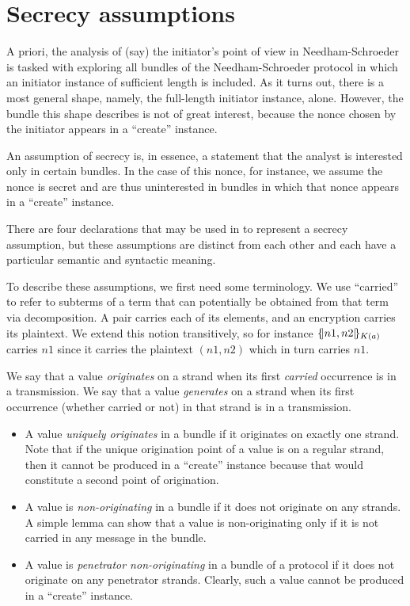 \section{Secrecy assumptions}
\label{sec:secrecy_assumptions}
A priori, the analysis of (say) the initiator's point of view in
Needham-Schroeder is tasked with exploring all bundles of the
Needham-Schroeder protocol in which an initiator instance of
sufficient length is included.  As it turns out, there is a most
general shape, namely, the full-length initiator instance, alone.
However, the bundle this shape describes is not of great interest,
because the nonce chosen by the initiator appears in a ``create''
instance.

An assumption of secrecy is, in essence, a statement that the analyst
is interested only in certain bundles.  In the case of this nonce, for
instance, we assume the nonce is secret and are thus uninterested in
bundles in which that nonce appears in a ``create'' instance.

There are four declarations that may be used in {\cpsa} to represent
a secrecy assumption, but these assumptions are distinct from each other
and each have a particular semantic and syntactic meaning.

To describe these assumptions, we first need some terminology.  We
use ``carried'' to refer to subterms of a term that can potentially be
obtained from that term via decomposition. A pair carries each of its
elements, and an encryption carries its plaintext.  We extend this
notion transitively, so for instance $\{\!|n1, n2|\!\}_{K(a)}$ carries $n1$
since it carries the plaintext $(n1, n2)$ which in turn carries $n1$.

 We say that a value \emph{originates} on a strand
when its first \emph{carried} occurrence is in a transmission.
 We say that a value \emph{generates} on a strand
when its first occurrence (whether carried or not) in that strand is
in a transmission.

\begin{itemize}
\item A value \emph{uniquely originates} in a bundle if it originates
  on exactly one strand.  Note that if the unique origination point of
  a value is on a regular strand, then it cannot be produced in a
  ``create'' instance because that would constitute a second point of
  origination.

\item A value is \emph{non-originating} in a bundle if it does not
  originate on any strands.  A simple lemma can show that a value is
  non-originating only if it is not carried in any message in the
  bundle.

\item A value is \emph{penetrator non-originating} in a bundle of
  a protocol if it does not originate on any penetrator strands.
  Clearly, such a value cannot be produced in a ``create'' instance.
\end{itemize}

